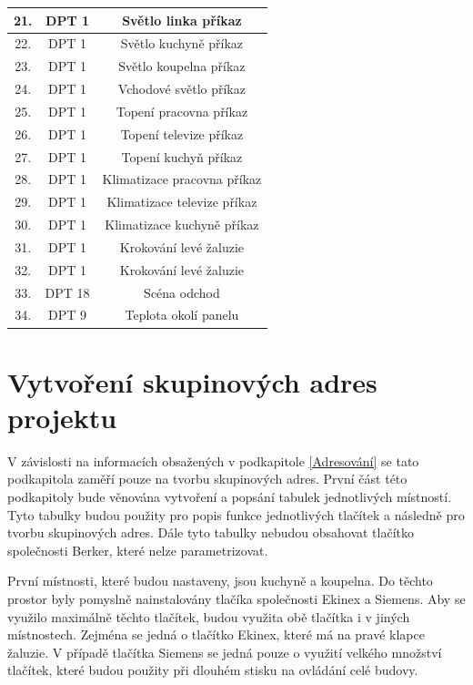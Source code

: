 \begin{table}[!ht]
\begin{tabular}{|c|c|c|}
          \hline
            21. & DPT 1 & Světlo linka příkaz \\
          \hline
            22. & DPT 1 & Světlo kuchyně příkaz \\
          \hline
            23. & DPT 1 & Světlo koupelna příkaz \\
          \hline
            24. & DPT 1 & Vchodové světlo příkaz \\
          \hline
            25. & DPT 1 & Topení pracovna příkaz \\
          \hline
            26. & DPT 1 & Topení televize příkaz \\
          \hline
            27. & DPT 1 & Topení kuchyň příkaz \\
          \hline
            28. & DPT 1 & Klimatizace pracovna příkaz \\
          \hline
            29. & DPT 1 & Klimatizace televize příkaz \\
          \hline
            30. & DPT 1 & Klimatizace kuchyně příkaz \\
          \hline
            31. & DPT 1 & Krokování levé žaluzie \\
          \hline
            32. & DPT 1 & Krokování levé žaluzie \\
          \hline
            33. & DPT 18 & Scéna odchod \\
          \hline
            34. & DPT 9 & Teplota okolí panelu \\
          \hline
  \end{tabular}
\end{table}
\newpage
\section{Vytvoření skupinových adres projektu}
V závislosti na informacích obsažených v podkapitole \ref{Adresování} se tato podkapitola zaměří pouze na tvorbu skupinových adres. První část této podkapitoly bude věnována vytvoření a popsání tabulek jednotlivých místností. Tyto tabulky budou použity pro popis funkce jednotlivých tlačítek a následně pro tvorbu skupinových adres. Dále tyto tabulky nebudou obsahovat tlačítko společnosti Berker, které nelze parametrizovat.

První místnosti, které budou nastaveny, jsou kuchyně a koupelna. Do těchto prostor byly pomyslně nainstalovány tlačíka společnosti Ekinex a Siemens. Aby se využilo maximálně těchto tlačítek, budou využita obě tlačítka i v jiných místnostech. Zejména se jedná o tlačítko Ekinex, které má na pravé klapce žaluzie. V případě tlačítka Siemens se jedná pouze o využití velkého množství tlačítek, které budou použity při dlouhém stisku na ovládání celé budovy. 

